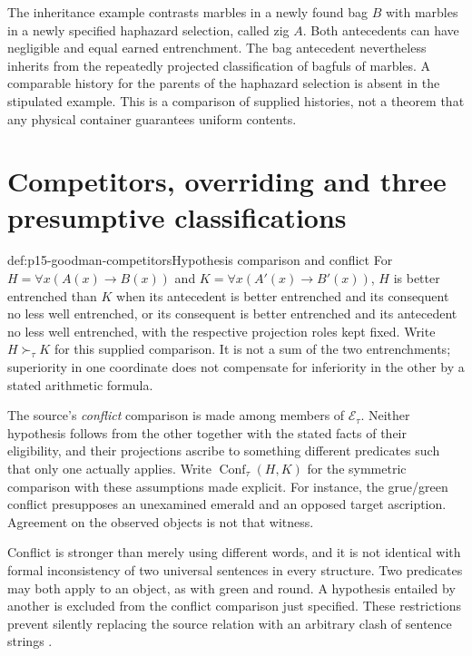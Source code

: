 The inheritance example contrasts marbles in a newly found bag $B$ with
marbles in a newly specified haphazard selection, called zig $A$. Both
antecedents can have negligible and equal earned entrenchment. The
bag antecedent nevertheless inherits from the repeatedly projected
classification of bagfuls of marbles. A comparable history for the
parents of the haphazard selection is absent in the stipulated example.
This is a comparison of supplied histories, not a theorem that any
physical container guarantees uniform contents.

\section{Competitors, overriding and three presumptive classifications}
\label{sec:p15-goodman-override}

\begin{hbdefinition}{def:p15-goodman-competitors}{Hypothesis comparison and conflict}
For $H=\forall x(A(x)\to B(x))$ and
$K=\forall x(A'(x)\to B'(x))$, $H$ is better entrenched than $K$
when its antecedent is better entrenched and its consequent no less well
entrenched, or its consequent is better entrenched and its antecedent
no less well entrenched, with the respective projection roles kept fixed.
Write $H\succ_\tau K$ for this supplied comparison. It is not a sum of
the two entrenchments; superiority in one coordinate does not compensate
for inferiority in the other by a stated arithmetic formula.

The source's \emph{conflict} comparison is made among members of
$\mathcal E_\tau$. Neither hypothesis follows from the other together
with the stated facts of their eligibility, and their projections ascribe
to something different predicates such that only one actually applies.
Write $\operatorname{Conf}_\tau(H,K)$ for the symmetric comparison
with these assumptions made explicit. For instance, the grue/green
conflict presupposes an unexamined emerald and an opposed target
ascription. Agreement on the observed objects is not that witness.
\end{hbdefinition}

Conflict is stronger than merely using different words, and it is not
identical with formal inconsistency of two universal sentences in every
structure. Two predicates may both apply to an object, as with green and
round. A hypothesis entailed by another is excluded from the conflict
comparison just specified. These restrictions prevent silently replacing
the source relation with an arbitrary clash of sentence strings
\parencite[pp.~93--94, 99--101]{Goodman1983FourthProjection}.

